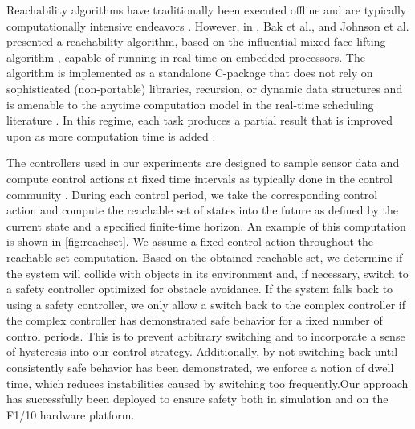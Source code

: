 \documentclass[manuscript,screen,review]{acmart}
\begin{document}
Reachability algorithms have traditionally been executed offline and are typically computationally intensive endeavors \cite{Johnson2012,Girard2006,Chen2013,AlthoffCORA2015,TranRL2019,manzanas2019arch_ainncs}. However, in \cite{Bak2014,Johnson2016}, Bak et al., and Johnson et al. presented a reachability algorithm, based on the influential mixed face-lifting algorithm \cite{dang2000}, capable of running in real-time on embedded processors. The algorithm is implemented as a standalone C-package that does not rely on sophisticated (non-portable) libraries, recursion, or dynamic data structures and is amenable to the anytime computation model in the real-time scheduling literature \cite{Liu1991}. In this regime, each task produces a partial result that is improved upon as more computation time is added \cite{Johnson2016}. 


The controllers used in our experiments are designed to sample sensor data and compute control actions at fixed time intervals as typically done in the control community \cite{Dai2020}. During each control period, we take the corresponding control action and compute the reachable set of states into the future as defined by the current state and a specified finite-time horizon. An example of this computation is shown in \ref{fig:reachset}. We assume a fixed control action throughout the reachable set computation. Based on the obtained reachable set, we determine if the system will collide with objects in its environment and, if necessary, switch to a safety controller optimized for obstacle avoidance. If the system falls back to using a safety controller, we only allow a switch back to the complex controller if the complex controller has demonstrated safe behavior for a fixed number of control periods. This is to prevent arbitrary switching and to incorporate a sense of hysteresis into our control strategy. Additionally, by not switching back until consistently safe behavior has been demonstrated, we enforce a notion of dwell time, which reduces instabilities caused by switching too frequently.Our approach has successfully been deployed to ensure safety both in simulation and on the F1/10 hardware platform.
\end{document}
